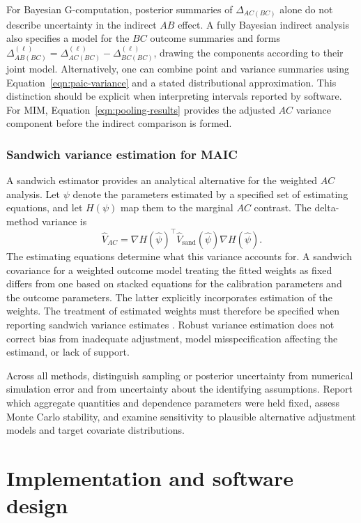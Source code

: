 \documentclass[article]{jss}
\begin{document}
For Bayesian G-computation, posterior summaries of $\Delta_{AC(BC)}$ alone do not describe uncertainty in the indirect $AB$ effect. A fully Bayesian indirect analysis also specifies a model for the $BC$ outcome summaries and forms $\Delta^{(\ell)}_{AB(BC)}=\Delta^{(\ell)}_{AC(BC)}-\Delta^{(\ell)}_{BC(BC)}$, drawing the components according to their joint model. Alternatively, one can combine point and variance summaries using Equation~\ref{eqn:paic-variance} and a stated distributional approximation. This distinction should be explicit when interpreting intervals reported by software. For MIM, Equation~\ref{eqn:pooling-results} provides the adjusted $AC$ variance component before the indirect comparison is formed.

\subsubsection{Sandwich variance estimation for MAIC}
\label{sec:variance_methods}
A sandwich estimator provides an analytical alternative for the weighted $AC$ analysis. Let $\psi$ denote the parameters estimated by a specified set of estimating equations, and let $H(\psi)$ map them to the marginal $AC$ contrast. The delta-method variance is
\begin{equation}
\label{eqn:sandwich-variance}
\widehat V_{AC}=\nabla H(\widehat\psi)^\top
\widehat V_{\mathrm{sand}}(\widehat\psi)
\nabla H(\widehat\psi).
\end{equation}
The estimating equations determine what this variance accounts for. A sandwich covariance for a weighted outcome model treating the fitted weights as fixed differs from one based on stacked equations for the calibration parameters and the outcome parameters. The latter explicitly incorporates estimation of the weights. The treatment of estimated weights must therefore be specified when reporting sandwich variance estimates \citep{remiro2022twostage}. Robust variance estimation does not correct bias from inadequate adjustment, model misspecification affecting the estimand, or lack of support.

Across all methods, distinguish sampling or posterior uncertainty from numerical simulation error and from uncertainty about the identifying assumptions. Report which aggregate quantities and dependence parameters were held fixed, assess Monte Carlo stability, and examine sensitivity to plausible alternative adjustment models and target covariate distributions.


\section{Implementation and software design}
\label{sec:implementation}
\end{document}
